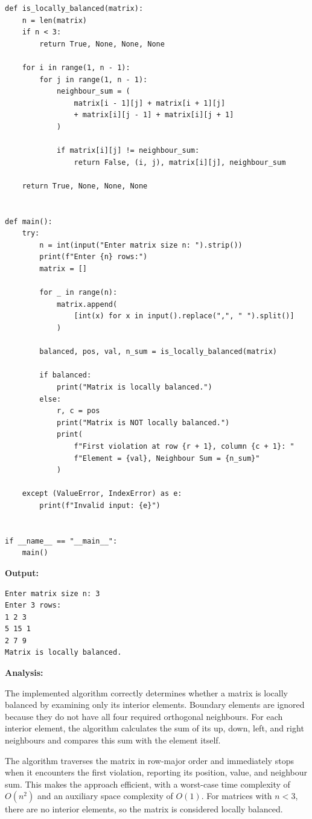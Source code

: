 \documentclass[12pt]{article}
\begin{document}
\begin{lstlisting}[style=code]
def is_locally_balanced(matrix):
    n = len(matrix)
    if n < 3:
        return True, None, None, None

    for i in range(1, n - 1):
        for j in range(1, n - 1):
            neighbour_sum = (
                matrix[i - 1][j] + matrix[i + 1][j]
                + matrix[i][j - 1] + matrix[i][j + 1]
            )

            if matrix[i][j] != neighbour_sum:
                return False, (i, j), matrix[i][j], neighbour_sum

    return True, None, None, None


def main():
    try:
        n = int(input("Enter matrix size n: ").strip())
        print(f"Enter {n} rows:")
        matrix = []

        for _ in range(n):
            matrix.append(
                [int(x) for x in input().replace(",", " ").split()]
            )

        balanced, pos, val, n_sum = is_locally_balanced(matrix)

        if balanced:
            print("Matrix is locally balanced.")
        else:
            r, c = pos
            print("Matrix is NOT locally balanced.")
            print(
                f"First violation at row {r + 1}, column {c + 1}: "
                f"Element = {val}, Neighbour Sum = {n_sum}"
            )

    except (ValueError, IndexError) as e:
        print(f"Invalid input: {e}")


if __name__ == "__main__":
    main()
\end{lstlisting}

\textbf{Output:}

\begin{lstlisting}[style=output]
Enter matrix size n: 3
Enter 3 rows:
1 2 3
5 15 1
2 7 9
Matrix is locally balanced.
\end{lstlisting}

\textbf{Analysis:}

The implemented algorithm correctly determines whether a matrix is locally balanced by examining only its interior elements. Boundary elements are ignored because they do not have all four required orthogonal neighbours. For each interior element, the algorithm calculates the sum of its up, down, left, and right neighbours and compares this sum with the element itself.

The algorithm traverses the matrix in row-major order and immediately stops when it encounters the first violation, reporting its position, value, and neighbour sum. This makes the approach efficient, with a worst-case time complexity of $O(n^2)$ and an auxiliary space complexity of $O(1)$. For matrices with $n < 3$, there are no interior elements, so the matrix is considered locally balanced.
\end{document}
